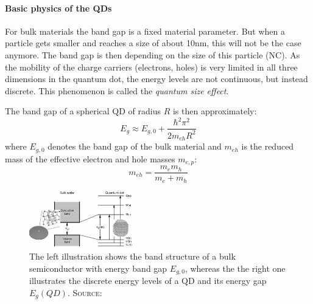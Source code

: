 	\paragraph{Basic physics of the \glspl{QD} }
		For bulk materials the band gap is a fixed material parameter. But when a particle gets smaller and reaches
		a size of about 10nm, this will not be the case anymore. The band gap is then depending on the size of this particle (\gls{NC}). As
		the mobility of the charge carriers (electrons, holes) is very limited in all three dimensions in the quantum dot, the energy levels
		are not continuous, but instead discrete.
		This phenomenon is called the {\it quantum size effect}.
		
		The band gap  of a spherical \gls{QD} of radius $R$ is then approximately:
		\begin{equation}
			E_{g} \approx E_{g,0} + \frac{\hbar^2 \pi^2}{2 m_{eh} R^2}
			\label{eq:Bandgap}
		\end{equation}
		where $E_{g,0}$ denotes the band gap of the bulk material and $m_{eh}$ is the reduced mass of the effective electron and hole masses $m_{e,p}$:
		\begin{equation}
			m_{eh} = \frac{m_e m_h}{m_e + m_h}
			\label{eq:QuantumBox}
		\end{equation}
		
		\begin{figure}[htbp]
			\centering
			\includegraphics[width=0.4\textwidth]{Fig/QDTheory.pdf}
			\caption{The left illustration shows the band structure of a bulk semiconductor with energy band gap $E_{g,0}$,
							 whereas the the right one illustrates the discrete energy levels of a \gls{QD} and its energy gap $E_{g}(QD)$.
							 {\scshape Source:} \cite[p.3]{Klimov}}
			\label{fig:QDTheory}
		\end{figure}
		
